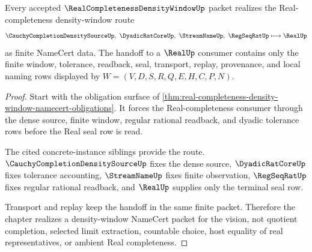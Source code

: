 \begin{theorem}
\label{thm:real-completeness-density-window-seal-handoff}
Every accepted $\RealCompletenessDensityWindowUp$ packet realizes the Real-completeness density-window route
$$
\CauchyCompletionDensitySourceUp,\ \DyadicRatCoreUp,\ \StreamNameUp,\ \RegSeqRatUp \longmapsto \RealUp
$$
as finite NameCert data. The handoff to a $\RealUp$ consumer contains only the finite window, tolerance, readback, seal, transport, replay, provenance, and local naming rows displayed by $W=(V,D,S,R,Q,E,H,C,P,N)$.
\end{theorem}
\begin{proof}
Start with the obligation surface of \autoref{thm:real-completeness-density-window-namecert-obligations}. It forces the Real-completeness consumer through the dense source, finite window, regular rational readback, and dyadic tolerance rows before the Real seal row is read.

The cited concrete-instance siblings provide the route. $\CauchyCompletionDensitySourceUp$ fixes the dense source, $\DyadicRatCoreUp$ fixes tolerance accounting, $\StreamNameUp$ fixes finite observation, $\RegSeqRatUp$ fixes regular rational readback, and $\RealUp$ supplies only the terminal seal row.

Transport and replay keep the handoff in the same finite packet. Therefore the chapter realizes a density-window NameCert packet for the vision, not quotient completion, selected limit extraction, countable choice, host equality of real representatives, or ambient Real completeness.
\end{proof}




